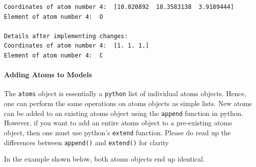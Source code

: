 \documentclass[11pt]{article}
\begin{document}
    \begin{Verbatim}[commandchars=\\\{\}]
Coordinates of atom number 4:  [10.020892  18.3583138  3.9189444]
Element of atom number 4:  O

Details after implementing changes: 
Coordinates of atom number 4:  [1. 1. 1.]
Element of atom number 4:  C

    \end{Verbatim}

    \paragraph{Adding Atoms to Models}\label{adding-atoms-to-models}

The \texttt{atoms} object is essentially a \texttt{python} list of
individual atoms objects. Hence, one can perform the same operations on
atoms objects as simple lists. New atoms can be added to an existing
atoms object using the \texttt{append} function in python. However, if
you want to add an entire atoms object to a pre-existing atoms object,
then one must use python's \texttt{extend} function. Please do read up
the differences between \texttt{append()} and \texttt{extend()} for
clarity

In the example shown below, both atoms objects end up identical.
\end{document}
